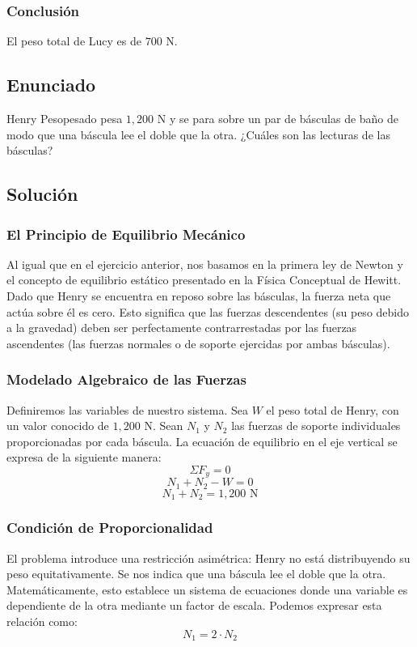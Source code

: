 \documentclass[12pt,letterpaper]{article}
\begin{document}
\subsubsection*{Conclusión}
El peso total de Lucy es de $700\text{ N}$.


\newpage

\subsection*{Enunciado}
Henry Pesopesado pesa $1,200\text{ N}$ y se para sobre un par de básculas de baño de modo que una báscula lee el doble que la otra. ¿Cuáles son las lecturas de las básculas?

\subsection*{Solución}

\subsubsection*{El Principio de Equilibrio Mecánico}
Al igual que en el ejercicio anterior, nos basamos en la primera ley de Newton y el concepto de equilibrio estático presentado en la Física Conceptual de Hewitt. Dado que Henry se encuentra en reposo sobre las básculas, la fuerza neta que actúa sobre él es cero. Esto significa que las fuerzas descendentes (su peso debido a la gravedad) deben ser perfectamente contrarrestadas por las fuerzas ascendentes (las fuerzas normales o de soporte ejercidas por ambas básculas).

\subsubsection*{Modelado Algebraico de las Fuerzas}
Definiremos las variables de nuestro sistema. Sea $W$ el peso total de Henry, con un valor conocido de $1,200\text{ N}$. Sean $N_{1}$ y $N_{2}$ las fuerzas de soporte individuales proporcionadas por cada báscula. 
La ecuación de equilibrio en el eje vertical se expresa de la siguiente manera:
$$\Sigma F_{y}=0$$
$$N_{1}+N_{2}-W=0$$
$$N_{1}+N_{2}=1,200\text{ N}$$

\subsubsection*{Condición de Proporcionalidad}
El problema introduce una restricción asimétrica: Henry no está distribuyendo su peso equitativamente. Se nos indica que una báscula lee el doble que la otra. Matemáticamente, esto establece un sistema de ecuaciones donde una variable es dependiente de la otra mediante un factor de escala. Podemos expresar esta relación como:
$$N_{1}=2\cdot N_{2}$$
\end{document}
